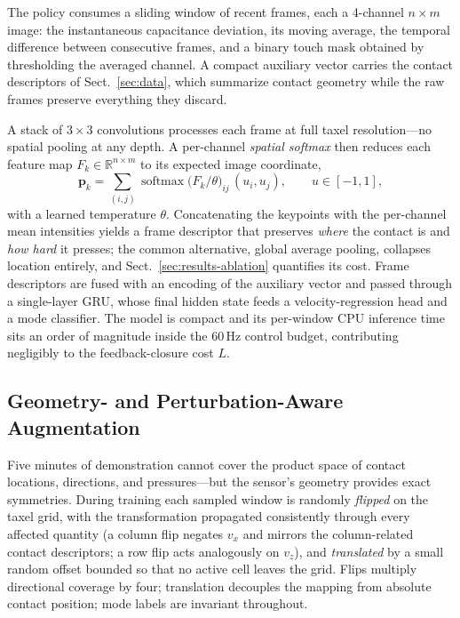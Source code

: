 \documentclass[runningheads]{llncs}
\begin{document}
The policy consumes a sliding window of recent frames, each a 4-channel
$n \times m$ image: the instantaneous capacitance deviation, its moving
average, the temporal difference between consecutive frames, and a
binary touch mask obtained by thresholding the averaged channel. A
compact auxiliary vector carries the contact descriptors of
Sect.~\ref{sec:data}, which summarize contact geometry while the raw
frames preserve everything they discard.

A stack of $3\times3$ convolutions processes each frame at full taxel
resolution---no spatial pooling at any depth. A per-channel
\emph{spatial softmax} then reduces each feature map
$F_k \in \mathbb{R}^{n\times m}$ to its expected image coordinate,
\begin{equation}
\mathbf{p}_k = \sum_{(i,j)}
\operatorname{softmax}\!\big(F_k/\theta\big)_{ij}\,(u_i, u_j),
\qquad u \in [-1, 1],
\label{eq:ssoftmax}
\end{equation}
with a learned temperature $\theta$. Concatenating the keypoints with
the per-channel mean intensities yields a frame descriptor that
preserves \emph{where} the contact is and \emph{how hard} it presses;
the common alternative, global average pooling, collapses location
entirely, and Sect.~\ref{sec:results-ablation} quantifies its cost.
Frame descriptors are fused with an encoding of the auxiliary vector and
passed through a single-layer GRU, whose final hidden state feeds a
velocity-regression head and a mode classifier. The model is compact and
its per-window CPU inference time sits an order of magnitude inside the
60\,Hz control budget, contributing negligibly to the feedback-closure
cost $L$.

\subsection{Geometry- and Perturbation-Aware Augmentation}
\label{sec:augment}

Five minutes of demonstration cannot cover the product space of contact
locations, directions, and pressures---but the sensor's geometry provides
exact symmetries. During training each sampled window is randomly
\emph{flipped} on the taxel grid, with the transformation propagated
consistently through every affected quantity (a column flip negates
$v_x$ and mirrors the column-related contact descriptors; a row flip
acts analogously on $v_z$), and \emph{translated} by a small random
offset bounded so that no active cell leaves the grid. Flips multiply
directional coverage by four; translation decouples the mapping from
absolute contact position; mode labels are invariant throughout.
\end{document}
